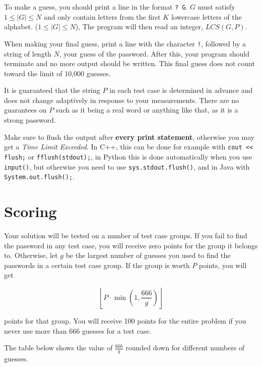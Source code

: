 To make a guess, you should print a line in the format \texttt{? G}. $G$ must satisfy $1 \le |G| \le N$
and only contain letters from the first $K$ lowercase letters of the alphabet. ($1 \le |G| \le N$),
The program will then read an integer, $LCS(G,P)$.

When making your final guess, print a line with the character \texttt{!}, followed by a string of length $N$,
your guess of the password. After this, your program should terminate and no more output should be written.
This final guess does not count toward the limit of 10,000 guesses.

It is guaranteed that the string $P$ in each test case is determined in advance and does not change adaptively in response to your measurements.
There are no guarantees on $P$ such as it being a real word or anything like that, as it is a strong password. 

Make sure to flush the output after \textbf{every print statement}, otherwise you may get a \textit{Time Limit Exceeded}.
In C++, this can be done for example with \texttt{cout << flush;} or \texttt{fflush(stdout);},
in Python this is done automatically when you use \texttt{input()}, but otherwise you need to use \texttt{sys.stdout.flush()},
and in Java with \texttt{System.out.flush();}.

\section*{Scoring}
Your solution will be tested on a number of test case groups. If you fail to
find the password in any test case, you will receive zero points for the group it belongs to. Otherwise, let
$g$ be the largest number of guesses you used to find the passwords in a certain test case group.
If the group is worth $P$ points, you will get

$$\left \lfloor{P \cdot \min(1, \frac{666}{g})}\right \rfloor $$

points for that group. You will receive 100 points for the entire problem if you never use more than 666 guesses for a test case.

The table below shows the value of $\frac{666}{g}$ rounded down for different numbers of guesses.

